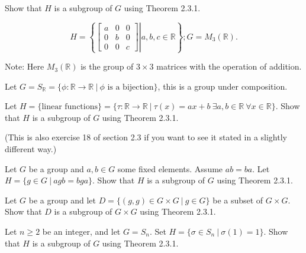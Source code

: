 
\newcommand{\R}{\mathbb{R}}


Show that $H$ is a subgroup of $G$ using Theorem 2.3.1.
	
\[H=\left\{\left.\begin{bmatrix}a&0&0\\0&b&0\\0&0&c\end{bmatrix}\right| a,b,c\in\R\right\}; G = M_3(\R).\]

Note: Here $M_3(\R)$ is the group of $3\times 3$ matrices with the operation of addition.
	

Let $G=S_\R=\{\phi:\R\to\R\ |\ \phi\text{ is a bijection}\}$, this is a group under composition.
	
Let $H=\{\text{linear functions}\}=\{\tau:\R\to\R\ |\ \tau(x)=ax+b\ \exists a,b\in\R\ \forall x\in \R\}$. Show that $H$ is a subgroup of $G$ using Theorem 2.3.1. 

(This is also exercise 18 of section 2.3 if you want to see it stated in a slightly different way.)


Let $G$ be a group and $a,b\in G$ some fixed elements. Assume $ab=ba$. Let $H=\{g\in G\ |\ agb=bga\}$. Show that $H$ is a subgroup of $G$ using Theorem 2.3.1.
	


Let $G$ be a group and let $D = \{(g,g)\in G\times G\ |\ g\in G\}$ be a subset of $G\times G$. Show that $D$ is a subgroup of $G\times G$ using Theorem 2.3.1.


Let $n\geq 2$ be an integer, and let $G=S_n$.  Set $H=\{\sigma\in S_n\ |\ \sigma(1)=1\}$. Show that $H$ is a subgroup of $G$ using Theorem 2.3.1.